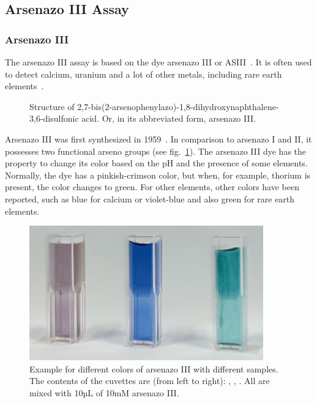 \newpage


\subsection{Arsenazo III Assay}

\subsubsection{Arsenazo III}
The arsenazo III assay is based on the dye arsenazo III or ASIII~\cite{arsenazo3assay}.
It is often used to detect calcium, uranium and a lot of other metals, including rare earth elements~\cite{arsenazo3usage, arsenazo3othermetals}.

\begin{figure}[H]
    \centering
    \caption{Structure of 2,7-bis(2-arsenophenylazo)-1,8-dihydroxynaphthalene-3,6-disulfonic acid. Or, in its abbreviated form, arsenazo III.}
    \label{fig:asiii_structure}
\end{figure}

Arsenazo III was first synthesized in 1959~\cite{arsenazo3fortyyears}.
In comparison to arsenazo I and II, it possesses two functional arseno groups (see fig.~\ref{fig:asiii_structure}).
The arsenazo III dye has the property to change its color based on the pH and the presence of some elements.
Normally, the dye has a pinkish-crimson color, but when, for example, thorium is present, the color changes to green.
For other elements, other colors have been reported, such as blue for calcium or violet-blue and also green for rare earth elements.

\begin{figure}[H]
    \centering
    \includegraphics[width=0.9\textwidth]{./media/images/asiii_color_change}
    \caption{Example for different colors of arsenazo III with different samples. The contents of the cuvettes are (from left to right): , , . All are mixed with 10µL of 10mM arsenazo III.}
    \label{fig:asiii_colors}
\end{figure}

